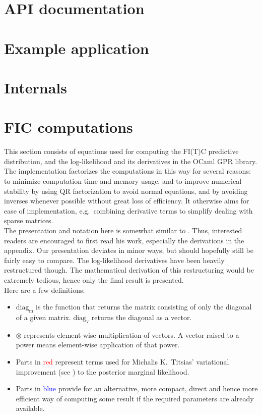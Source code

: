 \documentclass[10pt]{article}
\newcommand{\red}{\textcolor{red}}
\newcommand{\blue}{\textcolor{blue}}
\begin{document}
\section{API documentation}

\section{Example application}

\section{Internals}

\section{FIC computations}

This section consists of equations used for computing the FI(T)C
predictive distribution, and the log-likelihood and its derivatives
in the OCaml GPR library.  The implementation factorizes the
computations in this way for several reasons: to minimize computation
time and memory usage, and to improve numerical stability by using
QR factorization to avoid normal equations, and by avoiding inverses
whenever possible without great loss of efficiency.  It otherwise
aims for ease of implementation, e.g.\ combining derivative terms
to simplify dealing with sparse matrices.\\

The presentation and notation here is somewhat similar to
\cite{SnelsonThesis}.  Thus, interested readers are encouraged to
first read his work, especially the derivations in the appendix.
Our presentation deviates in minor ways, but should hopefully still
be fairly easy to compare.  The log-likelihood derivatives have
been heavily restructured though.  The mathematical derivation of
this restructuring would be extremely tedious, hence only the final
result is presented.\\

Here are a few definitions:

\begin{itemize}

\item $\mathrm{diag_m}$ is the function that returns the matrix
consisting of only the diagonal of a given matrix.  $\mathrm{diag_v}$
returns the diagonal as a vector.

\item $\otimes$ represents element-wise multiplication of vectors.
A vector raised to a power means element-wise application of that
power.

\item Parts in \red{red} represent terms used for Michalis K.\
Titsias' variational improvement (see \cite{Titsias2009}) to the
posterior marginal likelihood.

\item Parts in \blue{blue} provide for an alternative, more compact,
direct and hence more efficient way of computing some result if the
required parameters are already available.

\end{itemize}
\end{document}
